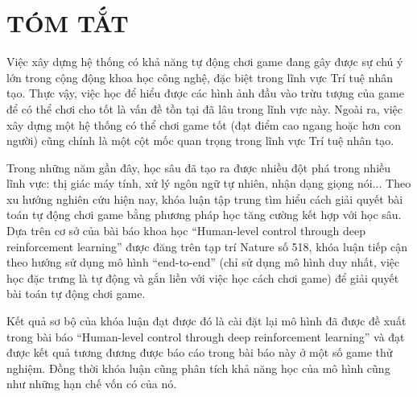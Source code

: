 \chapter*{TÓM TẮT}
Việc xây dựng hệ thống có khả năng tự động chơi game đang gây được sự chú ý lớn trong cộng động khoa học công nghệ, đặc biệt trong lĩnh vực Trí tuệ nhân tạo. 
Thực vậy, việc học để hiểu được các hình ảnh đầu vào trừu tượng của game để có thể chơi cho tốt là vấn đề tồn tại đã lâu trong lĩnh vực này.
Ngoài ra, việc xây dựng một hệ thống có thể chơi game tốt (đạt điểm cao ngang hoặc hơn con người) cũng chính là một cột mốc quan trọng trong lĩnh vực Trí tuệ nhân tạo.

Trong những năm gần đây, học sâu đã tạo ra được nhiều đột phá trong nhiều lĩnh vực: thị giác máy tính, xử lý ngôn ngữ tự nhiên, nhận dạng giọng nói... 
Theo xu hướng nghiên cứu hiện nay, khóa luận tập trung tìm hiểu cách giải quyết bài toán tự động chơi game bằng phương pháp học tăng cường kết hợp với học sâu. 
Dựa trên cơ sở của bài báo khoa học ``Human-level control through deep reinforcement learning'' được đăng trên tạp trí Nature số 518, khóa luận tiếp cận theo hướng sử dụng mô hình ``end-to-end'' (chỉ sử dụng mô hình duy nhất, việc học đặc trưng là tự động và gắn liền với việc học cách chơi game) để giải quyết bài toán tự động chơi game.

Kết quả sơ bộ của khóa luận đạt được đó là cài đặt lại mô hình đã được đề xuất trong bài báo ``Human-level control through deep reinforcement learning'' và đạt được kết quả tương đương được báo cáo trong bài báo này ở một số game thử nghiệm. 
Đồng thời khóa luận cũng phân tích khả năng học của mô hình cũng như những hạn chế vốn có của nó.